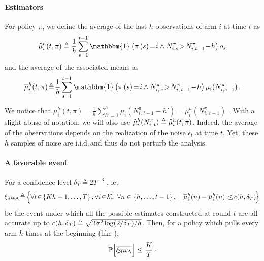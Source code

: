 \paragraph{Estimators}  
For policy $\pi$, we define the average of the last $h$ observations of arm $i$ at time $t$ as
\begin{equation}
\label{eq:def-hmu}
\widehat{\mu}_i^h(t,\pi) \triangleq \frac{1}{h}\sum_{s=1}^{t-1} \mathbbm{1}\pa{\pi\pa{s}\! =\! i \land N_{i,s}^\pi\!>\! N_{i,t-1}^\pi\! -\! h } o_{s}
\end{equation}
and the average of the associated means as
\begin{equation}
\label{eq:def-bmu}
\bar{\mu}_i^h(t,\pi) \!\triangleq\! \frac{1}{h}\sum_{s=1}^{t-1} \mathbbm{1}\pa{\pi\pa{s}\! =\! i \land N_{i,\,s}^\pi\!>\! N_{i,\,t-1}^\pi\! -\! h } \mu_{i}(N_{i,s-1}^\pi)\,.
\end{equation}

We notice that $\bar{\mu}_i^h(t,\pi) = \frac{1}{h}\sum_{h'=1}^{h} \mu_i(N_{i,\,t-1}^\pi-h') = \bar{\mu}_i^h(N_{i,\,t-1}^\pi)$ . With a slight abuse of notation, we will also use $\widehat{\mu}_i^h(N_{i,\,t}^\pi) \triangleq \widehat{\mu}_i^h(t,\pi)$. Indeed, the average of the observations depends on the realization of the noise $\epsilon_t$ at time $t$. Yet, these $h$ samples of noise are i.i.d.\,and thus do not perturb the analysis. 



\paragraph{A favorable event}

\begin{proposition}
\label{prop:prb_favorable_event_SWA}
For a confidence level $\delta_{T} \triangleq 2T^{-3}$
, let
\begin{equation}
\!\HPSWA \! \triangleq\! \Big\{\forall t\!\in\!\left\{Kh +1, \dots, T\right\}, \forall i\!\in\!\mathcal{K},\ \forall n\in \left\{h, \dots, t-1\right\}, \ \big| \ \hmu_i^h(n) - \bmu_i^h(n) \big| \!\leq\! c(\window, \delta_{T}) \!\Big\}
\label{eq:def_favorable_event_SWA}
\end{equation}
be the event under which all the possible estimates constructed at round $t$ are all accurate up to $c(h,\delta_{T}) \triangleq \sqrt{2 \sigma^2\log(2/\delta_T)/h}$. Then, for a policy which pulls every arm $h$ times at the beginning (like \SWA),
\[
\mathbb{P}\Big[\overline{\xi_{\rm SWA}}\Big] \leq\frac{K}{T}\,\cdot
\]
\end{proposition} 

